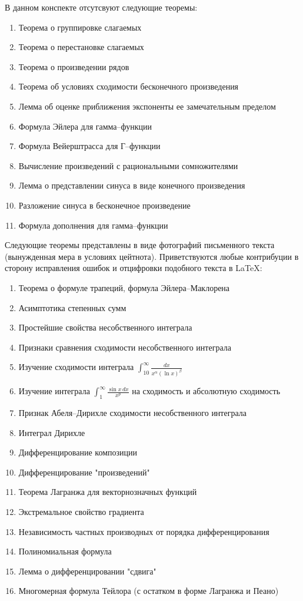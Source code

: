 \documentclass{article}
\begin{document}
В данном конспекте отсутсвуют следующие теоремы:
\begin{enumerate}
\item Теорема о группировке слагаемых
\item Теорема о перестановке слагаемых
\item Теорема о произведении рядов
\item Теорема об условиях сходимости бесконечного произведения
\item Лемма об оценке приближения экспоненты ее замечательным пределом
\item Формула Эйлера для гамма--функции
\item Формула Вейерштрасса для Г--функции
\item Вычисление произведений с рациональными сомножителями
\item Лемма о представлении синуса в виде конечного произведения
\item Разложение синуса в бесконечное произведение
\item Формула дополнения для гамма--функции
\end{enumerate}

Следующие теоремы представлены в виде фотографий письменного текста (вынужденная мера в условиях цейтнота). Приветствуются любые контрибуции в сторону исправления ошибок и отцифровки подобного текста в LaTeX:
\begin{enumerate}
    \item Теорема о формуле трапеций, формула Эйлера--Маклорена
    \item Асимптотика степенных сумм
    \item Простейшие свойства несобственного интеграла
    \item Признаки сравнения сходимости несобственного интеграла
    \item Изучение сходимости интеграла $\int_{10}^\infty \frac{dx}{x^\alpha (\ln x)^\beta}$
    \item Изучение интеграла $\int_1^{\infty} \frac{\sin x\,dx}{x^p}$ на сходимость и абсолютную сходимость
    \item Признак Абеля--Дирихле сходимости несобственного интеграла
    \item Интеграл Дирихле
    \item Дифференцирование композиции
    \item Дифференцирование "произведений"
    \item Теорема Лагранжа для векторнозначных функций
    \item Экстремальное свойство градиента
    \item Независимость частных производных от порядка дифференцирования
    \item Полиномиальная формула
    \item Лемма о дифференцировании "сдвига"
    \item Многомерная формула Тейлора (с остатком в форме Лагранжа и Пеано)
\end{enumerate}
\end{document}
